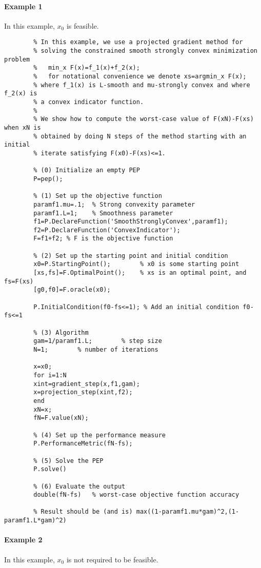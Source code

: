 \documentclass[11pt,a4paper]{article}
\begin{document}
		\paragraph{Example 1} In this example, $x_0$ is feasible.
		\begin{lstlisting}
		% In this example, we use a projected gradient method for
		% solving the constrained smooth strongly convex minimization problem
		%   min_x F(x)=f_1(x)+f_2(x);
		%   for notational convenience we denote xs=argmin_x F(x);
		% where f_1(x) is L-smooth and mu-strongly convex and where f_2(x) is
		% a convex indicator function.
		%
		% We show how to compute the worst-case value of F(xN)-F(xs) when xN is
		% obtained by doing N steps of the method starting with an initial
		% iterate satisfying F(x0)-F(xs)<=1.

		% (0) Initialize an empty PEP
		P=pep();

		% (1) Set up the objective function
		paramf1.mu=.1;	% Strong convexity parameter
		paramf1.L=1;    % Smoothness parameter
		f1=P.DeclareFunction('SmoothStronglyConvex',paramf1);
		f2=P.DeclareFunction('ConvexIndicator');
		F=f1+f2; % F is the objective function

		% (2) Set up the starting point and initial condition
		x0=P.StartingPoint();		 % x0 is some starting point
		[xs,fs]=F.OptimalPoint(); 	 % xs is an optimal point, and fs=F(xs)
		[g0,f0]=F.oracle(x0);

		P.InitialCondition(f0-fs<=1); % Add an initial condition f0-fs<=1

		% (3) Algorithm
		gam=1/paramf1.L;		% step size
		N=1;		% number of iterations

		x=x0;
		for i=1:N
		xint=gradient_step(x,f1,gam);
		x=projection_step(xint,f2);
		end
		xN=x;
		fN=F.value(xN);

		% (4) Set up the performance measure
		P.PerformanceMetric(fN-fs);

		% (5) Solve the PEP
		P.solve()

		% (6) Evaluate the output
		double(fN-fs)   % worst-case objective function accuracy

		% Result should be (and is) max((1-paramf1.mu*gam)^2,(1-paramf1.L*gam)^2)
		\end{lstlisting}
		\newpage
		\paragraph{Example 2} In this example, $x_0$ is not required to be feasible.
\end{document}
